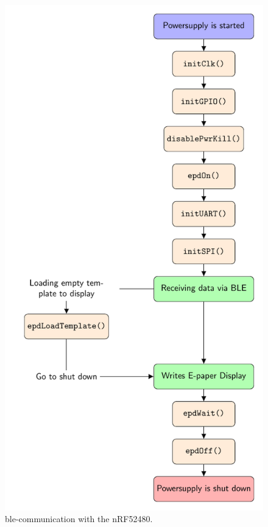 \begin{figure}[ht]
	\centering
	\includegraphics[height=0.9\textheight]{4-development/software/graphics/main.pdf}
	\caption{\acs{ble}-communication with the nRF52480.\label{software:main}}
\end{figure}


